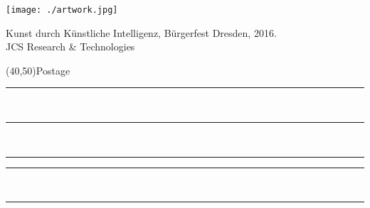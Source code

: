 \documentclass[a6paper,landscape,7pt]{scrartcl}
\begin{document}
\vspace*{-0.5cm} %
\vspace*{\fill}
\begin{center}
	\texttt{[image: ./artwork.jpg]}
\end{center}
\vfill

\clearpage


\begin{multicols}{2}
    Kunst durch Künstliche Intelligenz, Bürgerfest Dresden, 2016.\\
    {\small JCS Research \& Technologies}
    \columnbreak\par
    \hfill\framebox(40,50){\scriptsize Postage}\par
    \vspace{0.25\textheight}
    \rule{5.8cm}{0.01cm}\vspace*{1cm}\\ %
    \rule{5.8cm}{0.01cm}\vspace*{1cm}\\ %
    \rule{2.2cm}{0.01cm}\hspace*{0.2cm}\rule{3.4cm}{0.01cm}\vspace*{1cm}\\ %
    \rule{5.8cm}{0.01cm}\\ %
\end{multicols} 
\end{document}
